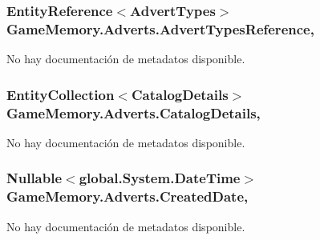 \hypertarget{class_game_memory_1_1_adverts_a12c5b442cf5e4ba2e320e1019aaaa5d5}{
\subsubsection[{Advert\-Types\-Reference}]{\setlength{\rightskip}{0pt plus 5cm}Entity\-Reference$<${\bf Advert\-Types}$>$ Game\-Memory.\-Adverts.\-Advert\-Types\-Reference\hspace{0.3cm}{\ttfamily [get]}, {\ttfamily [set]}}}\label{class_game_memory_1_1_adverts_a12c5b442cf5e4ba2e320e1019aaaa5d5}


No hay documentación de metadatos disponible. 

\hypertarget{class_game_memory_1_1_adverts_a40a5ee6d3ab8ddb1d41ea4f5808dab5c}{
\subsubsection[{Catalog\-Details}]{\setlength{\rightskip}{0pt plus 5cm}Entity\-Collection$<${\bf Catalog\-Details}$>$ Game\-Memory.\-Adverts.\-Catalog\-Details\hspace{0.3cm}{\ttfamily [get]}, {\ttfamily [set]}}}\label{class_game_memory_1_1_adverts_a40a5ee6d3ab8ddb1d41ea4f5808dab5c}


No hay documentación de metadatos disponible. 

\hypertarget{class_game_memory_1_1_adverts_a52b3de606dfe54c1fe35ea83a53d42e6}{
\subsubsection[{Created\-Date}]{\setlength{\rightskip}{0pt plus 5cm}Nullable$<$global.\-System.\-Date\-Time$>$ Game\-Memory.\-Adverts.\-Created\-Date\hspace{0.3cm}{\ttfamily [get]}, {\ttfamily [set]}}}\label{class_game_memory_1_1_adverts_a52b3de606dfe54c1fe35ea83a53d42e6}


No hay documentación de metadatos disponible. 

